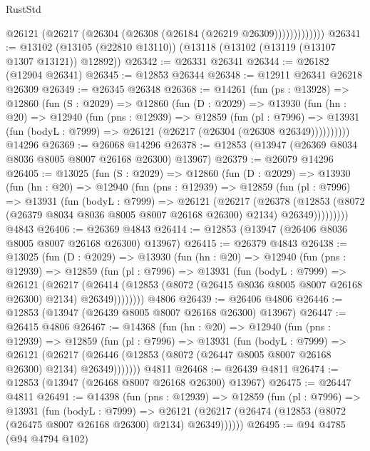 \begin{lexlean}{RustStd}
\begin{coremodule}
                  @26121 (@26217 (@26304 (@26308 (@26184 (@26219 @26309)))))))))))))
@26341 := @13102 (@13105 (@22810 @13110)) (@13118 (@13102 (@13119 (@13107 @1307 @13121)) @12892))
@26342 := @26331 @26341
@26344 := @26182 (@12904 @26341)
@26345 := @12853 @26344
@26348 := @12911 @26341 @26218 @26309
@26349 := @26345 @26348
@26368 := @14261
    (fun (ps : @13928) =>
    @12860
      (fun (S : @2029) =>
      @12860
        (fun (D : @2029) =>
        @13930
          (fun (hn : @20) =>
          @12940
            (fun (pns : @12939) =>
            @12859
              (fun (pl : @7996) =>
              @13931 (fun (bodyL : @7999) => @26121 (@26217 (@26304 (@26308 @26349))))))))))
    @14296
@26369 := @26068 @14296
@26378 := @12853 (@13947 (@26369 @8034 @8036 @8005 @8007 @26168 @26300) @13967)
@26379 := @26079 @14296
@26405 := @13025
    (fun (S : @2029) =>
    @12860
      (fun (D : @2029) =>
      @13930
        (fun (hn : @20) =>
        @12940
          (fun (pns : @12939) =>
          @12859
            (fun (pl : @7996) =>
            @13931
              (fun (bodyL : @7999) =>
              @26121
                (@26217
                  (@26378
                    (@12853
                      (@8072 (@26379 @8034 @8036 @8005 @8007 @26168 @26300) @2134)
                      @26349)))))))))
    @4843
@26406 := @26369 @4843
@26414 := @12853 (@13947 (@26406 @8036 @8005 @8007 @26168 @26300) @13967)
@26415 := @26379 @4843
@26438 := @13025
    (fun (D : @2029) =>
    @13930
      (fun (hn : @20) =>
      @12940
        (fun (pns : @12939) =>
        @12859
          (fun (pl : @7996) =>
          @13931
            (fun (bodyL : @7999) =>
            @26121
              (@26217
                (@26414
                  (@12853 (@8072 (@26415 @8036 @8005 @8007 @26168 @26300) @2134) @26349))))))))
    @4806
@26439 := @26406 @4806
@26446 := @12853 (@13947 (@26439 @8005 @8007 @26168 @26300) @13967)
@26447 := @26415 @4806
@26467 := @14368
    (fun (hn : @20) =>
    @12940
      (fun (pns : @12939) =>
      @12859
        (fun (pl : @7996) =>
        @13931
          (fun (bodyL : @7999) =>
          @26121
            (@26217 (@26446 (@12853 (@8072 (@26447 @8005 @8007 @26168 @26300) @2134) @26349)))))))
    @4811
@26468 := @26439 @4811
@26474 := @12853 (@13947 (@26468 @8007 @26168 @26300) @13967)
@26475 := @26447 @4811
@26491 := @14398
    (fun (pns : @12939) =>
    @12859
      (fun (pl : @7996) =>
      @13931
        (fun (bodyL : @7999) =>
        @26121 (@26217 (@26474 (@12853 (@8072 (@26475 @8007 @26168 @26300) @2134) @26349))))))
@26495 := @94 @4785 (@94 @4794 @102)

\end{coremodule}
\end{lexlean}
